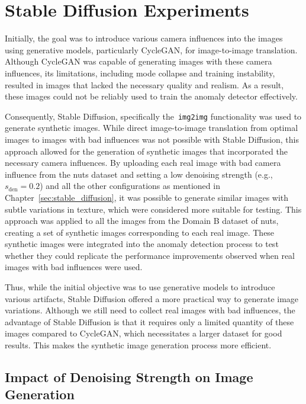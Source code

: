 \documentclass[12pt,DIV14,BCOR12mm,a4paper,footinclude=false,headinclude,parskip=half-,twoside,openright,cleardoublepage=empty,toc=index,bibliography=totoc,listof=totoc]{scrreprt}
\numberwithin{equation}{chapter}
\begin{document}
\section{Stable Diffusion Experiments}

Initially, the goal was to introduce various camera influences into the images using generative models, particularly CycleGAN, for image-to-image translation. Although CycleGAN was capable of generating images with these camera influences, its limitations, including mode collapse and training instability, resulted in images that lacked the necessary quality and realism. As a result, these images could not be reliably used to train the anomaly detector effectively.

Consequently, Stable Diffusion, specifically the~\texttt{img2img} functionality was used to generate synthetic images. While direct image-to-image translation from optimal images to images with bad influences was not possible with Stable Diffusion, this approach allowed for the generation of synthetic images that incorporated the necessary camera influences. By uploading each real image with bad camera influence from the nuts dataset and setting a low denoising strength (e.g., $s_{\text{den}} = 0.2$) and all the other configurations as mentioned in Chapter~\ref{sec:stable_diffusion}, it was possible to generate similar images with subtle variations in texture, which were considered more suitable for testing. This approach was applied to all the images from the Domain B dataset of nuts, creating a set of synthetic images corresponding to each real image. These synthetic images were integrated into the anomaly detection process to test whether they could replicate the performance improvements observed when real images with bad influences were used.

Thus, while the initial objective was to use generative models to introduce various artifacts, Stable Diffusion offered a more practical way to generate image variations. Although we still need to collect real images with bad influences, the advantage of Stable Diffusion is that it requires only a limited quantity of these images compared to CycleGAN, which necessitates a larger dataset for good results. This makes the synthetic image generation process more efficient.

\subsection{Impact of Denoising Strength on Image Generation}
\end{document}

